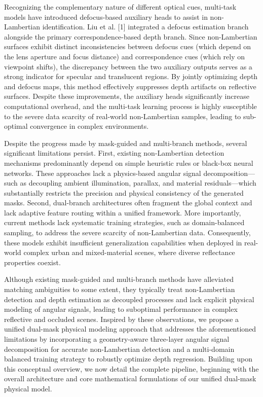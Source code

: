 Recognizing the complementary nature of different optical cues, multi-task models have introduced defocus-based auxiliary heads to assist in non-Lambertian identification. Liu et al. [1] integrated a defocus estimation branch alongside the primary correspondence-based depth branch. Since non-Lambertian surfaces exhibit distinct inconsistencies between defocus cues (which depend on the lens aperture and focus distance) and correspondence cues (which rely on viewpoint shifts), the discrepancy between the two auxiliary outputs serves as a strong indicator for specular and translucent regions. By jointly optimizing depth and defocus maps, this method effectively suppresses depth artifacts on reflective surfaces. Despite these improvements, the auxiliary heads significantly increase computational overhead, and the multi-task learning process is highly susceptible to the severe data scarcity of real-world non-Lambertian samples, leading to sub-optimal convergence in complex environments.

Despite the progress made by mask-guided and multi-branch methods, several significant limitations persist. First, existing non-Lambertian detection mechanisms predominantly depend on simple heuristic rules or black-box neural networks. These approaches lack a physics-based angular signal decomposition—such as decoupling ambient illumination, parallax, and material residuals—which substantially restricts the precision and physical consistency of the generated masks. Second, dual-branch architectures often fragment the global context and lack adaptive feature routing within a unified framework. More importantly, current methods lack systematic training strategies, such as domain-balanced sampling, to address the severe scarcity of non-Lambertian data. Consequently, these models exhibit insufficient generalization capabilities when deployed in real-world complex urban and mixed-material scenes, where diverse reflectance properties coexist.

Although existing mask-guided and multi-branch methods have alleviated matching ambiguities to some extent, they typically treat non-Lambertian detection and depth estimation as decoupled processes and lack explicit physical modeling of angular signals, leading to suboptimal performance in complex reflective and occluded scenes. Inspired by these observations, we propose a unified dual-mask physical modeling approach that addresses the aforementioned limitations by incorporating a geometry-aware three-layer angular signal decomposition for accurate non-Lambertian detection and a multi-domain balanced training strategy to robustly optimize depth regression. Building upon this conceptual overview, we now detail the complete pipeline, beginning with the overall architecture and core mathematical formulations of our unified dual-mask physical model.